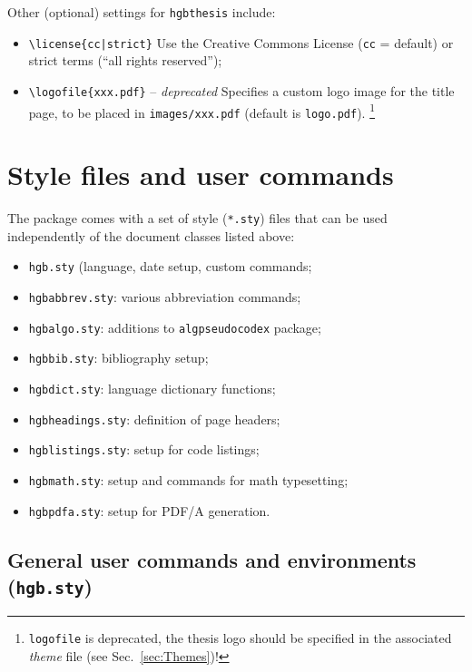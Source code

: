 \documentclass[english]{hgbarticle}
\begin{document}
\noindent
Other (optional) settings for \texttt{hgbthesis} include:
\begin{itemize}
    \item \verb!\license{cc|strict}!\newline
    Use the Creative Commons License (\texttt{cc} = default) or strict terms
      (``all rights reserved'');
    \item \verb!\logofile{xxx.pdf}! -- \emph{deprecated}\newline
    Specifies a custom logo image for the title page, to be placed in \verb!images/xxx.pdf!
    (default is \texttt{logo.pdf}).%
		\footnote{\texttt{{\bs}logofile} is deprecated, the thesis logo should be specified in the associated \emph{theme} 
		file (see Sec.~\ref{sec:Themes})!}
\end{itemize}

\section{Style files and user commands}

The package comes with a set of style (\texttt{*.sty}) files that can be used
independently of the document classes listed above:
\begin{itemize}
  \item \texttt{hgb.sty} (language, date setup, custom commands;
  \item \texttt{hgbabbrev.sty}: various abbreviation commands;
  \item \texttt{hgbalgo.sty}: additions to \texttt{algpseudocodex} package;
  \item \texttt{hgbbib.sty}: bibliography setup;
  \item \texttt{hgbdict.sty}: language dictionary functions;
  \item \texttt{hgbheadings.sty}: definition of page headers;
  \item \texttt{hgblistings.sty}: setup for code listings;
  \item \texttt{hgbmath.sty}: setup and commands for math typesetting;
  \item \texttt{hgbpdfa.sty}: setup for PDF/A generation.
\end{itemize}

\subsection{General user commands and environments (\texttt{hgb.sty})}
\label{sec:GeneralUserCommands}
\end{document}
